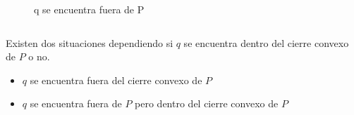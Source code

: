 \documentclass[aspectratio=169,xcolor=dvipsnames, t]{beamer}
\begin{document}
\begin{frame}
\begin{columns}
\begin{column}{0.45\textwidth}
\begin{figure}
          \caption{q se encuentra fuera de P}
        \end{figure}
      \end{column}
    \end{columns}
\end{frame}


\begin{frame}[c]
    Existen dos situaciones dependiendo si $q$ se encuentra dentro del cierre convexo de $P$ o no.
    \begin{itemize}
        \item $q$ se encuentra fuera del cierre convexo de  $P$
        \item $q$ se encuentra fuera de $P$ pero dentro del cierre convexo de $P$
    \end{itemize}
\end{frame}
\end{document}
